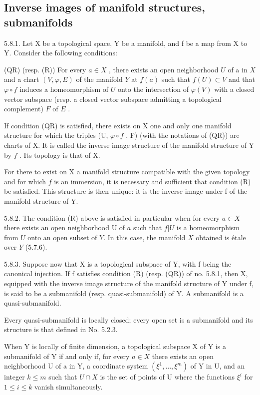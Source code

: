 \subsection{Inverse images of manifold structures, submanifolds}

5.8.1. Let X be a topological space, Y be a manifold, and f be a map from X to Y. Consider the following conditions:

(QR) (resp. (R)) For every \(a \in X\) , there exists an open neighborhood \(U\) of a in \(X\) and a chart \((V, \varphi, E)\) of the manifold \(Y\) at \(f(a)\) such that \(f(U) \subset V\) and that \(\varphi \circ f\) induces a homeomorphism of \(U\) onto the intersection of \(\varphi(V)\) with a closed vector subspace (resp. a closed vector subspace admitting a topological complement) \(F\) of \(E\) .

If condition (QR) is satisfied, there exists on X one and only one manifold structure for which the triples (U, \(\varphi \circ f\) , F) (with the notations of (QR)) are charts of X. It is called the inverse image structure of the manifold structure of Y by \(f\) . Its topology is that of X.

For there to exist on X a manifold structure compatible with the given topology and for which \(f\) is an immersion, it is necessary and sufficient that condition (R) be satisfied. This structure is then unique: it is the inverse image under f of the manifold structure of Y.

5.8.2. The condition (R) above is satisfied in particular when for every \(a \in X\) there exists an open neighborhood U of \(a\) such that \(f|U\) is a homeomorphism from \(U\) onto an open subset of \(Y\). In this case, the manifold \(X\) obtained is étale over \(Y\) (5.7.6).

5.8.3. Suppose now that X is a topological subspace of Y, with f being the canonical injection. If f satisfies condition (R) (resp. (QR)) of no. 5.8.1, then X, equipped with the inverse image structure of the manifold structure of Y under f, is said to be a submanifold (resp. quasi-submanifold) of Y. A submanifold is a quasi-submanifold.

Every quasi-submanifold is locally closed; every open set is a submanifold and its structure is that defined in No. 5.2.3.

When Y is locally of finite dimension, a topological subspace X of Y is a submanifold of Y if and only if, for every \(a \in X\) there exists an open neighborhood U of a in Y, a coordinate system \((\xi^{1}, \ldots, \xi^{m})\) of Y in U, and an integer \(k \leqslant m\) such that \(U \cap X\) is the set of points of U where the functions \(\xi^{i}\) for \(1 \leqslant i \leqslant k\) vanish simultaneously.

